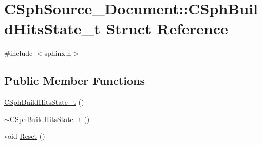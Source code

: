 \hypertarget{structCSphSource__Document_1_1CSphBuildHitsState__t}{\section{C\-Sph\-Source\-\_\-\-Document\-:\-:C\-Sph\-Build\-Hits\-State\-\_\-t Struct Reference}
\label{structCSphSource__Document_1_1CSphBuildHitsState__t}
}


{\ttfamily \#include $<$sphinx.\-h$>$}

\subsection*{Public Member Functions}
\begin{DoxyCompactItemize}
\item 
\hyperlink{structCSphSource__Document_1_1CSphBuildHitsState__t_a33bc2ea62f1fb55aeb282711082ac070}{C\-Sph\-Build\-Hits\-State\-\_\-t} ()
\item 
\hyperlink{structCSphSource__Document_1_1CSphBuildHitsState__t_a61f9ff001d8157c8b0ed877e0cf34d87}{$\sim$\-C\-Sph\-Build\-Hits\-State\-\_\-t} ()
\item 
void \hyperlink{structCSphSource__Document_1_1CSphBuildHitsState__t_a021715bd1ab1a61646684ca1368de92c}{Reset} ()
\end{DoxyCompactItemize}
